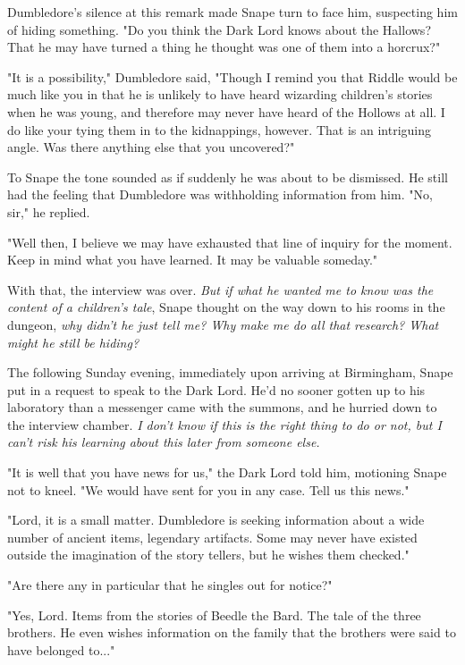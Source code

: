 \documentclass[a4paper,11pt]{article}
\begin{document}
Dumbledore's silence at this remark made Snape turn to face him, suspecting him of hiding something. "Do you think the Dark Lord knows about the Hallows? That he may have turned a thing he thought was one of them into a horcrux?"

"It is a possibility," Dumbledore said, "Though I remind you that Riddle would be much like you in that he is unlikely to have heard wizarding children's stories when he was young, and therefore may never have heard of the Hollows at all. I do like your tying them in to the kidnappings, however. That is an intriguing angle. Was there anything else that you uncovered?"

To Snape the tone sounded as if suddenly he was about to be dismissed. He still had the feeling that Dumbledore was withholding information from him. "No, sir," he replied.

"Well then, I believe we may have exhausted that line of inquiry for the moment. Keep in mind what you have learned. It may be valuable someday."

With that, the interview was over. \emph{But if what he wanted me to know was the content of a children's tale}, Snape thought on the way down to his rooms in the dungeon, \emph{why didn't he just tell me? Why make me do all that research? What might he still be hiding?}

The following Sunday evening, immediately upon arriving at Birmingham, Snape put in a request to speak to the Dark Lord. He'd no sooner gotten up to his laboratory than a messenger came with the summons, and he hurried down to the interview chamber. \emph{I don't know if this is the right thing to do or not, but I can't risk his learning about this later from someone else.}

"It is well that you have news for us," the Dark Lord told him, motioning Snape not to kneel. "We would have sent for you in any case. Tell us this news."

"Lord, it is a small matter. Dumbledore is seeking information about a wide number of ancient items, legendary artifacts. Some may never have existed outside the imagination of the story tellers, but he wishes them checked."

"Are there any in particular that he singles out for notice?"

"Yes, Lord. Items from the stories of Beedle the Bard. The tale of the three brothers. He even wishes information on the family that the brothers were said to have belonged to..."
\end{document}
